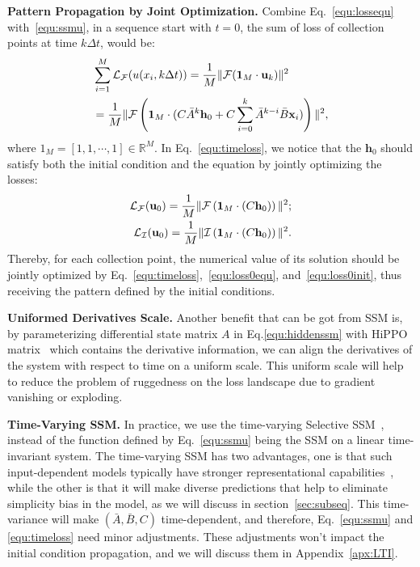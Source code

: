 \textbf{Pattern Propagation by Joint Optimization.}
Combine Eq.~\ref{equ:lossequ} with~\ref{equ:ssmu}, in a sequence start with $t=0$, the sum of loss of collection points at time $k\Delta t$, would be: 
\begin{align}
  &\sum_{i=1}^M \mathcal L_\mathcal F(u(x_i,k\Delta t)) =  \frac{1}{M}\mathcal \|\mathcal F( \mathbf 1_M\cdot \mathbf{u}_k)\Arrowvert^2\nonumber\\&=\frac{1}{M}\|\mathcal F\left(\mathbf1_M\cdot(C\bar A^k \mathbf h_0 + C\sum_{i=0}^k\bar A^{k-i}\bar B\mathbf x_i)\right)\Arrowvert^2,
  \label{equ:timeloss}
\end{align}
where $1_M=[1,1,\cdots,1] \in \mathbb R^M$. In Eq.~\ref{equ:timeloss}, we notice that the $\mathbf h_0$ should satisfy both the initial condition and the equation by jointly optimizing the losses:
\begin{align}\label{equ:loss0equ}
   \mathcal L_\mathcal F(\mathbf u_0) =  \frac{1}{M}\|\mathcal F\left(\mathbf1_M\cdot(C \mathbf h_0 )\right)\Arrowvert^2;\\
   \mathcal L_\mathcal I(\mathbf u_0) =  \frac{1}{M}\|\mathcal I\left(\mathbf1_M\cdot(C \mathbf h_0 )\right)\Arrowvert^2 .
   \label{equ:loss0init}
\end{align}
Thereby, for each collection point, the numerical value of its solution should be jointly optimized by Eq.~\ref{equ:timeloss},~\ref{equ:loss0equ}, and~\ref{equ:loss0init}, thus receiving the pattern defined by the initial conditions.


\textbf{Uniformed Derivatives Scale.} Another benefit that can be got from SSM is, by parameterizing differential state matrix $A$ in Eq.\ref{equ:hiddenssm} with HiPPO matrix~\cite{gu2020hippo} which contains the derivative information,  we can align the derivatives of the system with respect to time on a uniform scale. This uniform scale will help to reduce the problem of ruggedness on the loss landscape due to gradient vanishing or exploding.

\textbf{Time-Varying SSM.} In practice, we use the time-varying Selective SSM~\cite{gu2023mamba}, instead of the function defined by Eq.~\ref{equ:ssmu} being the SSM on a linear time-invariant system. The time-varying SSM has two advantages, one is that such input-dependent models typically have stronger representational capabilities~\cite{xu2024infinite}, while the other is that it will make diverse predictions that help to eliminate simplicity bias in the model, as we will discuss in section~\ref{sec:subseq}. This time-variance will make $(\bar A,\bar B, C)$ time-dependent, and therefore, Eq.~\ref{equ:ssmu} and \ref{equ:timeloss} need minor adjustments. These adjustments won't impact the initial condition propagation, and we will discuss them in Appendix~\ref{apx:LTI}.





